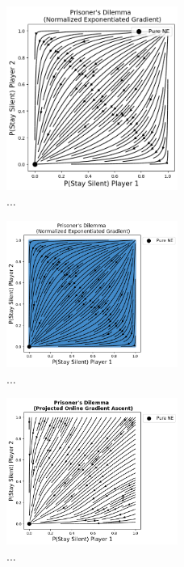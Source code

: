 \begin{figure}
    \centering
    \includegraphics[width=0.5\textwidth]{logos/Prisoners1.png}
    \caption{...}
    \label{Prisoners1}
\end{figure}

\begin{figure}
    \centering
    \includegraphics[width=0.5\textwidth]{logos/Prisoners2.png}
    \caption{...}
    \label{Prisoners2}
\end{figure}

\begin{figure}
    \centering
    \includegraphics[width=0.5\textwidth]{logos/Prisoners3.png}
    \caption{...}
    \label{Prisoners3}
\end{figure}


